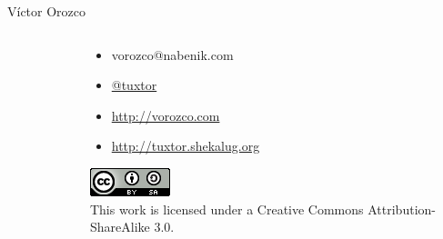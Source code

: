 \documentclass{beamer}
\begin{document}
\begin{frame}{Víctor Orozco}
\begin{columns}[T]
\begin{column}[T]{4cm}
\begin{figure}
		\end{figure}
	\end{column}
	\begin{column}[T]{6cm} %
		\begin{itemize}
			\item vorozco@nabenik.com
			\item \href{https://twitter.com/tuxtor}{@tuxtor}
			\item \href{http://vorozco.com}{http://vorozco.com}
			\item \href{http://tuxtor.shekalug.org}{http://tuxtor.shekalug.org} 
		\end{itemize}
	\begin{center}
		\includegraphics[width=0.1\linewidth]{Images/cclogo}
		\\
		This work is licensed under a Creative Commons Attribution-ShareAlike 3.0.
	\end{center}
	\end{column}
\end{columns}
\end{frame}
\end{document}
